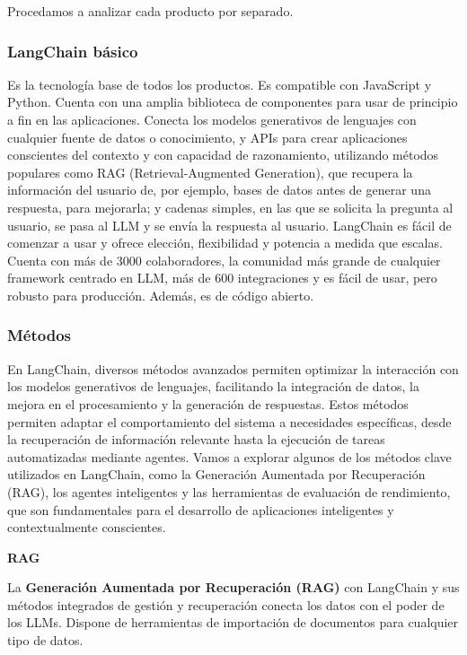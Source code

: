 Procedamos a analizar cada producto por separado.


\subsubsection{LangChain básico}

Es la tecnología base de todos los productos. Es compatible con JavaScript y Python. Cuenta con una amplia biblioteca de componentes para usar de principio a fin en las aplicaciones. Conecta los modelos generativos de lenguajes con cualquier fuente de datos o conocimiento, y APIs para crear aplicaciones conscientes del contexto y con capacidad de razonamiento, utilizando métodos populares como RAG (Retrieval-Augmented Generation), que recupera la información del usuario de, por ejemplo, bases de datos antes de generar una respuesta, para mejorarla; y cadenas simples, en las que se solicita la pregunta al usuario, se pasa al LLM y se envía la respuesta al usuario. LangChain es fácil de comenzar a usar y ofrece elección, flexibilidad y potencia a medida que escalas. Cuenta con más de 3000 colaboradores, la comunidad más grande de cualquier framework centrado en LLM, más de 600 integraciones y es fácil de usar, pero robusto para producción. Además, es de código abierto. \cite{PaginaLangChainOficialBasico} \cite{mavroudis2024langchain}


\subsubsection{Métodos}

En LangChain, diversos métodos avanzados permiten optimizar la interacción con los modelos generativos de lenguajes, facilitando la integración de datos, la mejora en el procesamiento y la generación de respuestas. Estos métodos permiten adaptar el comportamiento del sistema a necesidades específicas, desde la recuperación de información relevante hasta la ejecución de tareas automatizadas mediante agentes. Vamos a explorar algunos de los métodos clave utilizados en LangChain, como la Generación Aumentada por Recuperación (RAG), los agentes inteligentes y las herramientas de evaluación de rendimiento, que son fundamentales para el desarrollo de aplicaciones inteligentes y contextualmente conscientes.

\textbf{RAG}

La \textbf{Generación Aumentada por Recuperación (RAG)} con LangChain y sus métodos integrados de gestión y recuperación conecta los datos con el poder de los LLMs. Dispone de herramientas de importación de documentos para cualquier tipo de datos.

